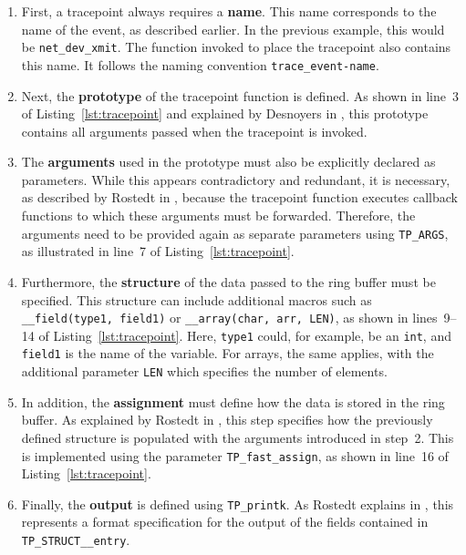 \begin{enumerate}
    \item First, a tracepoint always requires a \textbf{name}.  
          This name corresponds to the name of the event, as described earlier.  
          In the previous example, this would be \texttt{net\_dev\_xmit}.  
          The function invoked to place the tracepoint also contains this name.  
          It follows the naming convention \texttt{trace\_event-name}.  

    \item Next, the \textbf{prototype} of the tracepoint function is defined.  
          As shown in line~3 of Listing~\ref{lst:tracepoint} and explained by Desnoyers in \cite{tracepoints}, this prototype contains all arguments passed when the tracepoint is invoked.  

    \item The \textbf{arguments} used in the prototype must also be explicitly declared as parameters.  
          While this appears contradictory and redundant, it is necessary, as described by Rostedt in \cite{tracepoints_3}, because the tracepoint function executes callback functions to which these arguments must be forwarded.  
          Therefore, the arguments need to be provided again as separate parameters using \texttt{TP\_ARGS}, as illustrated in line~7 of Listing~\ref{lst:tracepoint}.  

    \item Furthermore, the \textbf{structure} of the data passed to the ring buffer must be specified.  
          This structure can include additional macros such as \texttt{\_\_field(type1, field1)} or \texttt{\_\_array(char, arr, LEN)}, as shown in lines~9--14 of Listing~\ref{lst:tracepoint}.  
          Here, \texttt{type1} could, for example, be an \texttt{int}, and \texttt{field1} is the name of the variable.  
          For arrays, the same applies, with the additional parameter \texttt{LEN} which specifies the number of elements.  

    \item In addition, the \textbf{assignment} must define how the data is stored in the ring buffer.  
          As explained by Rostedt in \cite{tracepoints_3}, this step specifies how the previously defined structure is populated with the arguments introduced in step~2.  
          This is implemented using the parameter \texttt{TP\_fast\_assign}, as shown in line~16 of Listing~\ref{lst:tracepoint}.  

    \item Finally, the \textbf{output} is defined using \texttt{TP\_printk}.  
          As Rostedt explains in \cite{tracepoints_3}, this represents a format specification for the output of the fields contained in \texttt{TP\_STRUCT\_\_entry}.  
\end{enumerate}  

